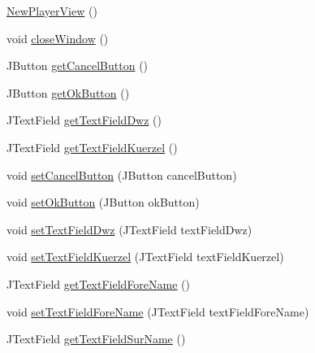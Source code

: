 \begin{DoxyCompactItemize}
\item 
\hyperlink{classde_1_1turnierverwaltung_1_1view_1_1_new_player_view_adb193a1618b1204868d178db41cfab17}{New\+Player\+View} ()
\item 
void \hyperlink{classde_1_1turnierverwaltung_1_1view_1_1_new_player_view_a9cbbdbd265ad6e3df5287b4a077ae703}{close\+Window} ()
\item 
J\+Button \hyperlink{classde_1_1turnierverwaltung_1_1view_1_1_new_player_view_a095ac42193c192fab16d81d6389942e3}{get\+Cancel\+Button} ()
\item 
J\+Button \hyperlink{classde_1_1turnierverwaltung_1_1view_1_1_new_player_view_a60ac9714f39e1c490210f869460ef127}{get\+Ok\+Button} ()
\item 
J\+Text\+Field \hyperlink{classde_1_1turnierverwaltung_1_1view_1_1_new_player_view_ad8cb23d9a927dbcc9c698f68954fe940}{get\+Text\+Field\+Dwz} ()
\item 
J\+Text\+Field \hyperlink{classde_1_1turnierverwaltung_1_1view_1_1_new_player_view_aaba93affdcbda55fcc25e18bc64a4371}{get\+Text\+Field\+Kuerzel} ()
\item 
void \hyperlink{classde_1_1turnierverwaltung_1_1view_1_1_new_player_view_a46f328f624054ad5a08ee2fe71696de1}{set\+Cancel\+Button} (J\+Button cancel\+Button)
\item 
void \hyperlink{classde_1_1turnierverwaltung_1_1view_1_1_new_player_view_a2c86ee072ec6dfe290d1a12970c1ddc0}{set\+Ok\+Button} (J\+Button ok\+Button)
\item 
void \hyperlink{classde_1_1turnierverwaltung_1_1view_1_1_new_player_view_a62add8870f59fa19997be65b453455d3}{set\+Text\+Field\+Dwz} (J\+Text\+Field text\+Field\+Dwz)
\item 
void \hyperlink{classde_1_1turnierverwaltung_1_1view_1_1_new_player_view_aeb3ed0b7f266b8dc3edd61be5786985f}{set\+Text\+Field\+Kuerzel} (J\+Text\+Field text\+Field\+Kuerzel)
\item 
J\+Text\+Field \hyperlink{classde_1_1turnierverwaltung_1_1view_1_1_new_player_view_a0bd8ee2e24665c8f7287f9ab71ddfb19}{get\+Text\+Field\+Fore\+Name} ()
\item 
void \hyperlink{classde_1_1turnierverwaltung_1_1view_1_1_new_player_view_af0688b471504953801249feffe205f56}{set\+Text\+Field\+Fore\+Name} (J\+Text\+Field text\+Field\+Fore\+Name)
\item 
J\+Text\+Field \hyperlink{classde_1_1turnierverwaltung_1_1view_1_1_new_player_view_af896466573f401d146ce73472f5c9196}{get\+Text\+Field\+Sur\+Name} ()

\end{DoxyCompactItemize}

